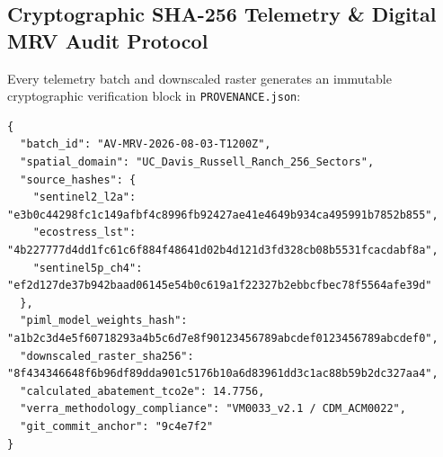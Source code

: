 \documentclass[sn-mathphys-num,Numbered]{sn-jnl}
\begin{document}
\begin{appendices}
\section{Cryptographic SHA-256 Telemetry \& Digital MRV Audit Protocol}\label{app:crypto_mrv}
Every telemetry batch and downscaled raster generates an immutable cryptographic verification block in \texttt{PROVENANCE.json}:
\begin{lstlisting}
{
  "batch_id": "AV-MRV-2026-08-03-T1200Z",
  "spatial_domain": "UC_Davis_Russell_Ranch_256_Sectors",
  "source_hashes": {
    "sentinel2_l2a": "e3b0c44298fc1c149afbf4c8996fb92427ae41e4649b934ca495991b7852b855",
    "ecostress_lst": "4b227777d4dd1fc61c6f884f48641d02b4d121d3fd328cb08b5531fcacdabf8a",
    "sentinel5p_ch4": "ef2d127de37b942baad06145e54b0c619a1f22327b2ebbcfbec78f5564afe39d"
  },
  "piml_model_weights_hash": "a1b2c3d4e5f60718293a4b5c6d7e8f90123456789abcdef0123456789abcdef0",
  "downscaled_raster_sha256": "8f434346648f6b96df89dda901c5176b10a6d83961dd3c1ac88b59b2dc327aa4",
  "calculated_abatement_tco2e": 14.7756,
  "verra_methodology_compliance": "VM0033_v2.1 / CDM_ACM0022",
  "git_commit_anchor": "9c4e7f2"
}
\end{lstlisting}

\end{appendices}


\end{document}
